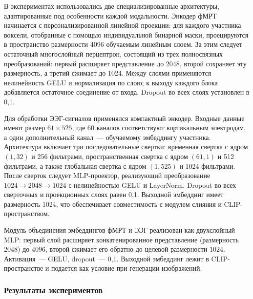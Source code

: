 В экспериментах использовались две специализированные архитектуры, адаптированные под особенности каждой модальности. Энкодер фМРТ начинается с персонализированной линейной проекции: для каждого участника воксели, отобранные с помощью индивидуальной бинарной маски, проецируются в пространство размерности 4096 обучаемым линейным слоем. За этим следует остаточный многослойный перцептрон, состоящий из трех полносвязных преобразований: первый расширяет представление до 2048, второй сохраняет эту размерность, а третий сжимает до 1024. Между слоями применяются нелинейность GELU и нормализация по слою; к выходу каждого блока добавляется остаточное соединение от входа. Dropout во всех слоях установлен в 0{,}1.

Для обработки ЭЭГ-сигналов применялся компактный энкодер. Входные данные имеют размер $61 \times 525$, где 60 каналов соответствуют кортикальным электродам, а один дополнительный канал~--- обучаемому эмбеддингу участника. Архитектура включает три последовательные свертки: временная свертка с ядром $(1, 32)$ и 256 фильтрами, пространственная свертка с ядром $(61, 1)$ и 512 фильтрами, а также глобальная свертка с ядром $(1, 525)$ и 1024 фильтрами. После сверток следует MLP-проектор, реализующий преобразование $1024 \to 2048 \to 1024$ с нелинейностью GELU и LayerNorm. Dropout во всех сверточных и проекционных слоях равен 0{,}1. Выходной эмбеддинг имеет размерность 1024, что обеспечивает совместимость с модулем слияния и CLIP-пространством.

Модуль объединения эмбеддингов фМРТ и ЭЭГ реализован как двухслойный MLP: первый слой расширяет конкатенированное представление (размерность $2048$) до $4096$, второй сжимает его обратно до целевой размерности $1024$. Активация~--- GELU, dropout~--- 0{,}1. Выходной эмбеддинг лежит в CLIP-пространстве и подается как условие при генерации изображений.

\subsubsection{Результаты экспериментов}\label{sec4:results}

